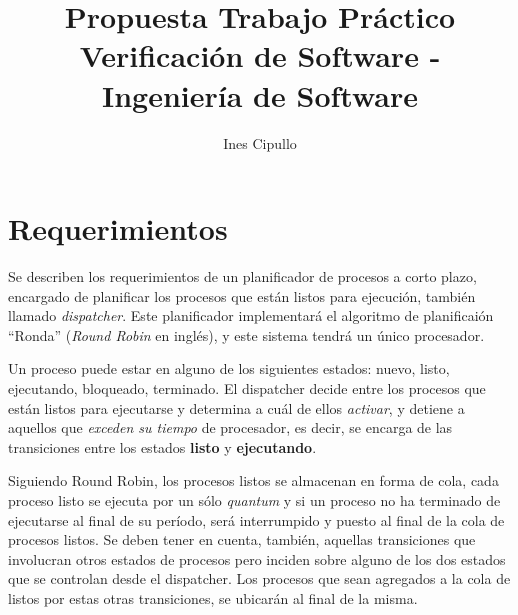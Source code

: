 \documentclass{article}
\title{Propuesta Trabajo Práctico Verificación de Software - Ingeniería de Software}
\author{Ines Cipullo}
\date{}
\begin{document}
\thispagestyle{empty}
\maketitle
{}

\section*{Requerimientos}

Se describen los requerimientos de un planificador de procesos a corto plazo, encargado de planificar los procesos que están listos para ejecución, también llamado \textit{dispatcher}. Este planificador implementará el algoritmo de planificaión ``Ronda'' (\textit{Round Robin} en inglés), y este sistema tendrá un único procesador.

Un proceso puede estar en alguno de los siguientes estados: nuevo, listo, ejecutando, bloqueado, terminado. El dispatcher decide entre los procesos que están listos para ejecutarse y determina a cuál de ellos \textit{activar}, y detiene a aquellos que \textit{exceden su tiempo} de procesador, es decir, se encarga de las transiciones entre los estados \textbf{listo} y \textbf{ejecutando}. 

Siguiendo Round Robin, los procesos listos se almacenan en forma de cola, cada proceso listo se ejecuta por un sólo \textit{quantum} y si un proceso no ha terminado de ejecutarse al final de su período, será interrumpido y puesto al final de la cola de procesos listos.
Se deben tener en cuenta, también, aquellas transiciones que involucran otros estados de procesos pero inciden sobre alguno de los dos estados que se controlan desde el dispatcher. Los procesos que sean agregados a la cola de listos por estas otras transiciones, se ubicarán al final de la misma.





\end{document}
